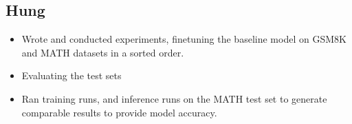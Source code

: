 \subsection{Hung}
\begin{itemize}
    \item Wrote and conducted experiments, finetuning the baseline model on GSM8K and MATH datasets in a sorted order. 
    \item Evaluating the test sets
    \item Ran training runs, and inference runs on the MATH test set to generate comparable results to provide model accuracy.
\end{itemize}


